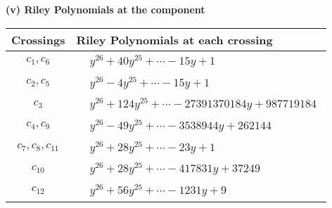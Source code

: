 \documentclass[1p]{elsarticle_modified}
\theoremstyle{definition}
\begin{document}
\flushleft \textbf{(v) Riley Polynomials at the component}\newline \\
\begin{tabular}{m{50pt}|m{274pt}}
Crossings & \hspace{64pt}Riley Polynomials at each crossing \\
\hline $$\begin{aligned}c_{1},c_{6}\end{aligned}$$&$\begin{aligned}
&y^{26}+40 y^{25}+\cdots-15 y+1
\end{aligned}$\\
\hline $$\begin{aligned}c_{2},c_{5}\end{aligned}$$&$\begin{aligned}
&y^{26}-4 y^{25}+\cdots-15 y+1
\end{aligned}$\\
\hline $$\begin{aligned}c_{3}\end{aligned}$$&$\begin{aligned}
&y^{26}+124 y^{25}+\cdots-27391370184 y+987719184
\end{aligned}$\\
\hline $$\begin{aligned}c_{4},c_{9}\end{aligned}$$&$\begin{aligned}
&y^{26}-49 y^{25}+\cdots-3538944 y+262144
\end{aligned}$\\
\hline $$\begin{aligned}c_{7},c_{8},c_{11}\end{aligned}$$&$\begin{aligned}
&y^{26}+28 y^{25}+\cdots-23 y+1
\end{aligned}$\\
\hline $$\begin{aligned}c_{10}\end{aligned}$$&$\begin{aligned}
&y^{26}+28 y^{25}+\cdots-417831 y+37249
\end{aligned}$\\
\hline $$\begin{aligned}c_{12}\end{aligned}$$&$\begin{aligned}
&y^{26}+56 y^{25}+\cdots-1231 y+9
\end{aligned}$\\
\hline
\end{tabular}\\~\\
\end{document}
